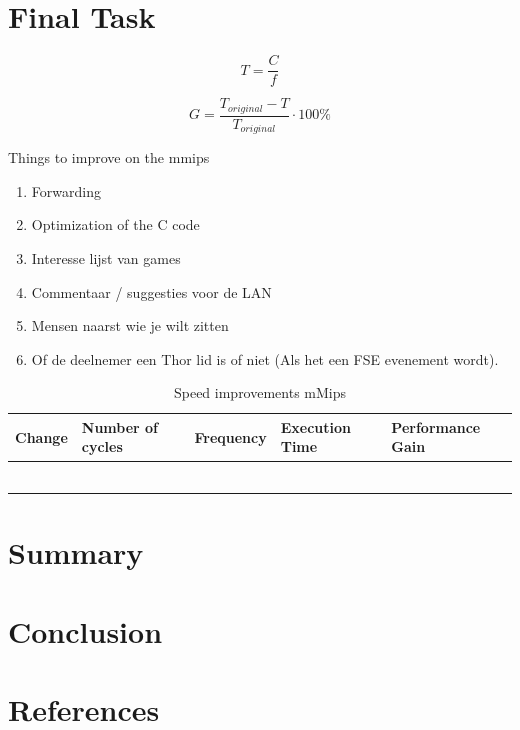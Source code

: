 \documentclass[10pt]{article}
\begin{document}
\section{Final Task}

\begin{equation}\label{time}
  T = \frac{C}{f}
\end{equation}

\begin{equation}\label{gain}
  G = \frac{T_{original} - T}{T_{original}} \cdot 100 \%
\end{equation}

Things to improve on the mmips
\begin{enumerate}
  \item Forwarding
  \item Optimization of the C code
  \item Interesse lijst van games
  \item Commentaar / suggesties voor de LAN
  \item Mensen naarst wie je wilt zitten
  \item Of de deelnemer een Thor lid is of niet (Als het een FSE evenement wordt).\\
\end{enumerate}


\begin{table}[H]
\centering
\caption{Speed improvements mMips}
\label{tab:speedimp}
\begin{tabular}{@{}lllll@{}}
\toprule
Change &Number of cycles & Frequency  & Execution Time & Performance Gain \\ \midrule
& &  & &  \\
& &  & & \\
& &  & & \\
& &  & & \\
& &  & & \\
& &  & & \\
 \bottomrule
\end{tabular}
\end{table}


\section{Summary}

\section{Conclusion}

\section{References}
\end{document}
